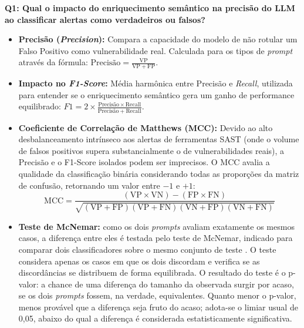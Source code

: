 \textbf{Q1: Qual o impacto do enriquecimento semântico na precisão do LLM ao classificar alertas como verdadeiros ou falsos?}
\begin{itemize}
\item \textbf{Precisão (\textit{Precision}):} Compara a capacidade do modelo de não rotular um Falso Positivo como vulnerabilidade real. Calculada para os tipos de \textit{prompt} através da fórmula: $\mbox{Precisão} = \frac{\mathrm{VP}}{\mathrm{VP} + \mathrm{FP}}$.
\item \textbf{Impacto no \textit{F1-Score}:} Média harmônica entre Precisão e \textit{Recall}, utilizada para entender se o enriquecimento semântico gera um ganho de performance equilibrado: $F1 = 2 \times \frac{\mbox{Precisão} \times \mathrm{Recall}}{\mbox{Precisão} + \mathrm{Recall}}$.

\item \textbf{Coeficiente de Correlação de Matthews (MCC):} Devido ao alto desbalanceamento intrínseco aos alertas de ferramentas SAST (onde o volume de falsos positivos supera substancialmente o de vulnerabilidades reais), a Precisão e o F1-Score isolados podem ser imprecisos. O MCC avalia a qualidade da classificação binária considerando todas as proporções da matriz de confusão, retornando um valor entre $-1$ e $+1$:
$$\mathrm{MCC} = \frac{(\mathrm{VP} \times \mathrm{VN}) - (\mathrm{FP} \times \mathrm{FN})}{\sqrt{(\mathrm{VP}+\mathrm{FP})(\mathrm{VP}+\mathrm{FN})(\mathrm{VN}+\mathrm{FP})(\mathrm{VN}+\mathrm{FN})}}$$
\item \textbf{Teste de McNemar:} como os dois \textit{prompts} avaliam exatamente os mesmos casos, a diferença entre eles é testada pelo teste de McNemar, indicado para comparar dois classificadores sobre o mesmo conjunto de teste \cite{dietterich1998tests}. O teste considera apenas os casos em que os dois discordam e verifica se as discordâncias se distribuem de forma equilibrada. O resultado do teste é o p-valor: a chance de uma diferença do tamanho da observada surgir por acaso, se os dois \textit{prompts} fossem, na verdade, equivalentes. Quanto menor o p-valor, menos provável que a diferença seja fruto do acaso; adota-se o limiar usual de 0,05, abaixo do qual a diferença é considerada estatisticamente significativa.
\end{itemize}

